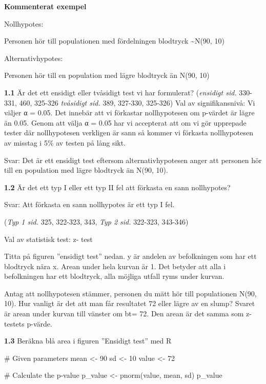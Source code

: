 \documentclass[
  letterpaper,
  DIV=11,
  numbers=noendperiod]{scrartcl}
\newenvironment{Shaded}{\begin{snugshade}}{\end{snugshade}}
\newcommand{\CommentTok}[1]{\textcolor[rgb]{0.37,0.37,0.37}{#1}}
\newcommand{\DecValTok}[1]{\textcolor[rgb]{0.68,0.00,0.00}{#1}}
\newcommand{\FunctionTok}[1]{\textcolor[rgb]{0.28,0.35,0.67}{#1}}
\newcommand{\NormalTok}[1]{\textcolor[rgb]{0.00,0.23,0.31}{#1}}
\newcommand{\OtherTok}[1]{\textcolor[rgb]{0.00,0.23,0.31}{#1}}
\begin{document}
\textbf{Kommenterat exempel}

Nollhypotes:

Personen hör till populationen med fördelningen blodtryck
\textasciitilde N(90, 10)

Alternativhypotes:

Personen hör till en population med lägre blodtryck än N(90, 10)

\textbf{1.1} Är det ett ensidigt eller tvåsidigt test vi har formulerat?
(\emph{ensidigt sid.} 330-331, 460, 325-326 \emph{tvåsidigt sid.} 389,
327-330, 325-326) Val av signifikansnivå: Vi väljer α = 0.05. Det
innebär att vi förkastar nollhypotesen om p-värdet är lägre än 0.05.
Genom att välja α = 0.05 har vi accepterat att om vi gör upprepade
tester där nollhypotesen verkligen är sann så kommer vi förkasta
nollhypotesen av misstag i 5\% av testen på lång sikt.

Svar: Det är ett ensidigt test eftersom alternativhypotesen anger att
personen hör till en population med lägre blodtryck än N(90, 10).

\textbf{1.2} Är det ett typ I eller ett typ II fel att förkasta en sann
nollhypotes?

Svar: Att förkasta en sann nollhypotes är ett typ I fel.

(\emph{Typ 1 sid.} 325, 322-323, 343, \emph{Typ 2 sid.} 322-323,
343-346)

Val av statistisk test: z- test

Titta på figuren ''ensidigt test'' nedan. y är andelen av befolkningen
som har ett blodtryck nära x. Arean under hela kurvan är 1. Det betyder
att alla i befolkningen har ett blodtryck, alla möjliga utfall ryms
under kurvan.

Antag att nollhypotesen stämmer, personen du mätt hör till populationen
N(90, 10). Hur vanligt är det att man får resultatet 72 eller lägre av
en slump? Svaret är arean under kurvan till vänster om bt= 72. Den arean
är det samma som z-testets p-värde.

\textbf{1.3} Beräkna blå area i figuren ''Ensidigt test'' med R

\begin{Shaded}
\begin{Highlighting}[]
\CommentTok{\# Given parameters}
\NormalTok{mean }\OtherTok{\textless{}{-}} \DecValTok{90}
\NormalTok{sd }\OtherTok{\textless{}{-}} \DecValTok{10}
\NormalTok{value }\OtherTok{\textless{}{-}} \DecValTok{72}

\CommentTok{\# Calculate the p{-}value}
\NormalTok{p\_value }\OtherTok{\textless{}{-}} \FunctionTok{pnorm}\NormalTok{(value, mean, sd)}
\NormalTok{p\_value}
\end{Highlighting}
\end{Shaded}
\end{document}
